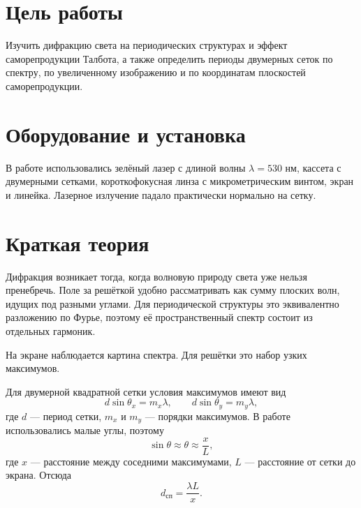 \documentclass[twoside]{mfitjournal}
\begin{document}
\author{Евгений Иванов}

\makeatletter
\renewcommand{\tit}{}
\renewcommand{\@oddhead}{}
\renewcommand{\@evenhead}{}
\makeatother

\pagestyle{fancy}
\fancyhf{}

\maketitle

\section*{Цель работы}

Изучить дифракцию света на периодических структурах и эффект саморепродукции Талбота, а также определить периоды двумерных сеток по спектру, по увеличенному изображению и по координатам плоскостей саморепродукции.

\section*{Оборудование и установка}

В работе использовались зелёный лазер с длиной волны $\lambda = 530$ нм, кассета с двумерными сетками, короткофокусная линза с микрометрическим винтом, экран и линейка. Лазерное излучение падало практически нормально на сетку.

\section*{Краткая теория}

Дифракция возникает тогда, когда волновую природу света уже нельзя пренебречь. Поле за решёткой удобно рассматривать как сумму плоских волн, идущих под разными углами. Для периодической структуры это эквивалентно разложению по Фурье, поэтому её пространственный спектр состоит из отдельных гармоник.

На экране наблюдается картина спектра. Для решётки это набор узких максимумов.

Для двумерной квадратной сетки условия максимумов имеют вид
\begin{equation}
d\sin\theta_x = m_x\lambda, \qquad d\sin\theta_y = m_y\lambda,
\end{equation}
где $d$ --- период сетки, $m_x$ и $m_y$ --- порядки максимумов. В работе использовались малые углы, поэтому
\begin{equation}
\sin\theta \approx \theta \approx \frac{x}{L},
\end{equation}
где $x$ --- расстояние между соседними максимумами, $L$ --- расстояние от сетки до экрана. Отсюда
\begin{equation}
d_{\text{сп}} = \frac{\lambda L}{x}.
\end{equation}
\end{document}

